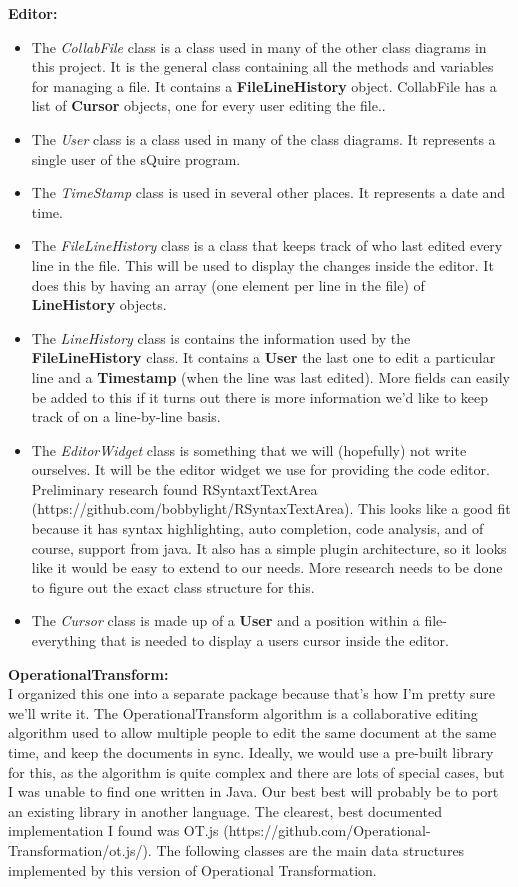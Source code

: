 \documentclass[twoside,letterpaper]{article}
\begin{document}
	\textbf{Editor:}\\
	\begin{itemize}
	\item The \textit{CollabFile} class is a class used in many of the other class diagrams in this project. It is the general class containing all the methods and variables for managing a file. It contains a \textbf{FileLineHistory} object. CollabFile has a list of \textbf{Cursor} objects, one for every user editing the file..
	  \item The \textit{User} class is a class used in many of the class diagrams. It represents a single user of the sQuire program.
	  \item The \textit{TimeStamp} class is used in several other places. It represents a date and time.
		\item The \textit{FileLineHistory} class is a class that keeps track of who last edited every line in the file. This will be used to display the changes inside the editor. It does this by having an array (one element per line in the file) of \textbf{LineHistory} objects.
	  \item The \textit{LineHistory} class is contains the information used by the \textbf{FileLineHistory} class. It contains a \textbf{User} {the last one to edit a particular line} and a \textbf{Timestamp} (when the line was last edited). More fields can easily be added to this if it turns out there is more information we'd like to keep track of on a line-by-line basis.
		\item The \textit{EditorWidget} class is something that we will (hopefully) not write ourselves. It will be the editor widget we use for providing the code editor. Preliminary research found RSyntaxtTextArea (https://github.com/bobbylight/RSyntaxTextArea). This looks like a good fit because it has syntax highlighting, auto completion, code analysis, and of course, support from java. It also has a simple plugin architecture, so it looks like it would be easy to extend to our needs. More research needs to be done to figure out the exact class structure for this.
	  \item The \textit{Cursor} class is made up of a \textbf{User} and a position within a file- everything that is needed to display a users cursor inside the editor.
	\end{itemize}
	\textbf{OperationalTransform:} \\\bigskip
	I organized this one into a separate package because that's how I'm pretty sure we'll write it. The OperationalTransform algorithm is a collaborative editing algorithm used to allow multiple people to edit the same document at the same time, and keep the documents in sync. Ideally, we would use a pre-built library for this, as the algorithm is quite complex and there are lots of special cases, but I was unable to find one written in Java. Our best best will probably be to port an existing library in another language. The clearest, best documented implementation I found was OT.js (https://github.com/Operational-Transformation/ot.js/). The following classes are the main data structures implemented by this version of Operational Transformation.
\end{document}
